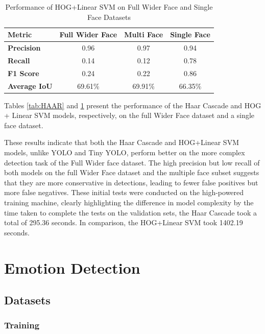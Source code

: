\begin{table}[h!]
\centering{}
\caption{Performance of HOG+Linear SVM on Full Wider Face and Single Face Datasets}
\begin{tabular}{|l|c|c|c|}
\hline
\textbf{Metric}      & \textbf{Full Wider Face} & \textbf{Multi Face}  & \textbf{Single Face} \\ \hline
\textbf{Precision}   & 0.96       & 0.97           & 0.94               \\ \hline
\textbf{Recall}      & 0.14       & 0.12           & 0.78               \\ \hline
\textbf{F1 Score}    & 0.24       & 0.22           & 0.86               \\ \hline
\textbf{Average IoU} & 69.61\%      & 69.91\%           & 66.35\%              \\ \hline
\end{tabular}
\label{tab:HOGSVM}
\end{table}

Tables \ref{tab:HAAR} and \ref{tab:HOGSVM} present the performance of the Haar Cascade and HOG + Linear SVM models, respectively, on the full Wider Face dataset and a single face dataset.

These results indicate that both the Haar Cascade and HOG+Linear SVM models, unlike YOLO and Tiny YOLO, perform better on the more complex detection task of the Full Wider face dataset. The high precision but low recall of both models on the full Wider Face dataset and the multiple face subset suggests that they are more conservative in detections, leading to fewer false positives but more false negatives. These initial tests were conducted on the high-powered training machine, clearly highlighting the difference in model complexity by the time taken to complete the tests on the validation sets, the Haar Cascade took a total of 295.36 seconds. In comparison, the HOG+Linear SVM took 1402.19 seconds.

\section{Emotion Detection}
\subsection{Datasets}
\subsubsection{Training}

